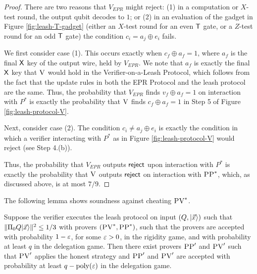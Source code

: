 \begin{proof}
There are two reasons that $V_{EPR}$ might reject: (1) in a computation or $X$-test round, the output qubit decodes to $1$; or (2) in an evaluation of the gadget in Figure \ref{fig:leash-T-gadget} (either an $X$-test round for an even $\sf T$ gate, or a $Z$-test round for an odd $\sf T$ gate) the condition ${c}_i=a_j\oplus e_i$ fails. 

We first consider case (1). This occurs exactly when ${c_f}\oplus a_f=1$, where $a_f$ is the final $\sf X$ key of the output wire, held by $V_{EPR}$. We note that $a_f$ is exactly the final $\sf X$ key that $\textsc{V}$ would hold in the Verifier-on-a-Leash Protocol, which follows from the fact that the update rules in both the EPR Protocol and the leash protocol are the same. Thus, the probability that $V_{EPR}$ finds ${v_f}\oplus a_f=1$ on interaction with $P^*$ is exactly the probability that $\textsc{V}$ finds $c_f\oplus a_f=1$ in Step 5 of Figure \ref{fig:leash-protocol-V}. 

Next, consider case (2). The condition ${c}_i\neq a_{j}\oplus e_i$ is exactly
 the condition in which a verifier interacting with $P^*$ as in Figure \ref{fig:leash-protocol-V} would reject (see Step 4.(b)).

Thus, the probability that $V_{EPR}$ outputs $\sf reject$ upon interaction with $P^*$ is exactly the probability that $\textsc{V}$ outputs $\sf reject$ on interaction with $\textsc{PP}^*$, which, as discussed above, is at most $7/9$.
\end{proof}





\noindent The following lemma shows soundness against cheating $\textsc{PV}^*$.

\begin{lemma}\label{soundlemma}
Suppose the verifier executes the leash protocol  on input $(Q,|\vec{x}\rangle)$ such that $\|\Pi_0 Q|\vec{x}\rangle\|^2 \leq 1/3$ with provers $(\textsc{PV}^*,\textsc{PP}^*)$, such that the provers are accepted with probability $1-\varepsilon$, for some $\varepsilon>0$, in the rigidity game, and with probability at least $q$ in the delegation game. Then there exist provers $\textsc{PP}'$ and $\textsc{PV}'$ such that $\textsc{PV}'$ applies the honest strategy and $\textsc{PP}'$ and $\textsc{PV}'$ are accepted with probability at least $q-\operatorname{poly}(\varepsilon)$ in the delegation game.
\end{lemma}

